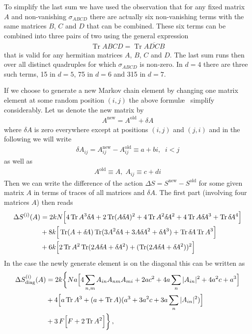 \documentclass[10pt,a4paper]{article}
\newcommand{\RN}[1]{%
    \textup{\uppercase\expandafter{\romannumeral#1}}%
}
\DeclareMathOperator{\Tr}{Tr}
\newcommand{\deltaA}{\delta \! A}
\begin{document}
To simplify the last sum we have used the observation that for
any fixed matrix $A$ and non-vanishing $\sigma_{ABCD}$ there are
actually six non-vanishing terms with the same matrices $B$, $C$
and $D$ that can be combined. These six terms can be combined into
three pairs of two using the general expression
\begin{align}
  \Tr ABCD = \Tr \overline{ADCB}
\end{align}
that is valid for any hermitian matrices $A$, $B$, $C$ and $D$.
The last sum runs then over all distinct quadruples for which
$\sigma_{ABCD}$ is non-zero.
In $d=4$ there are three such terms, 15 in $d=5$, 75 in $d=6$
and 315 in $d=7$.

\newpage

If we choose to generate a new Markov chain element by changing one
matrix element at some random position $(i,j)$ the above formul\ae~
simplify considerably.
Let us denote the new matrix by
\begin{align}
  A^{\text{new}} = A^{\text{old}} + \deltaA
\end{align}
where $\deltaA$ is zero everywhere except at positions $(i,j)$ and
$(j,i)$ and in the following we will write
\begin{align}
  \deltaA_{ij} = A_{ij}^{\text{new}} - A_{ij}^{\text{old}}
  \equiv a + bi, \;\; i<j
\end{align}
as well as
\begin{align}
  A^{\text{old}} \equiv A, \; A_{ij}
  \equiv c + di
\end{align}
Then we can write the difference of the action $\Delta S = S^{\text{new}}
- S^{\text{old}}$ for some given matrix $A$ in terms of traces of
all matrices and $\deltaA$.
The first part (involving four matrices $A$) then reads
\begin{align}
  \Delta S^{(\RN 1)} (A) &=
  2kN
  \Big[
    4 \Tr A^3 \deltaA
    + 2 \Tr (A \deltaA)^2
    + 4 \Tr A^2 \deltaA^2
    + 4 \Tr A \deltaA^3 + \Tr \deltaA^4
  \Big]
  \nonumber \\
  &+ 8k
  \Big[
    \Tr(A+\deltaA) \Tr(3 A^2 \deltaA
    + 3 A \deltaA^2
    + \deltaA^3)
    + \Tr \deltaA \Tr A^3
  \Big]
  \nonumber \\
  &+ 6k
  \Big[
    2\Tr A^2 \Tr(2A \deltaA+\deltaA^2)
    + (\Tr(2A \deltaA+\deltaA^2))^2
  \Big]
\end{align}
In the case the newly generate element is on the diagonal this can
be written as
\begin{align}
  \Delta S^{(\RN{1})}_{\text{diag}} (A) &= 2k \bigg\{ Na \Big[
      4 \sum_{n,m} A_{in} A_{nm} A_{mi} + 2a c^2
      +4 a \sum_n |A_{in}|^2 + 4 a^2 c + a^3
  \Big]\\
  &+4 \Big[
    a \Tr A^3
    + (a+\Tr A)( a^3 + 3a^2c + 3 a \sum_n |A_{in}|^2 )
  \Big]\\
  &+3 \, F \Big[
   F + 2 \Tr A^2
  \Big]
 \bigg\} \,,
\end{align}
\end{document}
